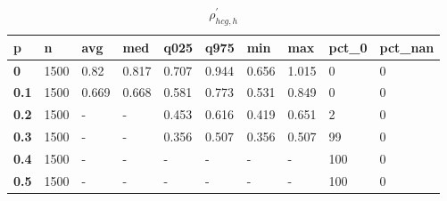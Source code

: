 \begin{table}[h]
 \centering 
\footnotesize
\caption{$\rho_{hcg,h}^\prime $}
\label{tab:alphahcgh}
\begin{tabular}[h]{|l|l|l|l|l|l|l|l|l|l|
    } \hline
\textbf{ p} & \textbf{ n} & \textbf{ avg} & \textbf{ med} & \textbf{ q025} & \textbf{ q975} & \textbf{ min} & \textbf{ max} & \textbf{ pct\_0} & \textbf{ pct\_nan}
    \\ \hline
  \textbf{  0} & 1500 &  0.82 & 0.817 & 0.707 & 0.944 & 0.656 & 1.015 &   0 & 0
    \\ \hline
  \textbf{0.1} & 1500 & 0.669 & 0.668 & 0.581 & 0.773 & 0.531 & 0.849 &   0 & 0
    \\ \hline
  \textbf{0.2} & 1500 & - & - & 0.453 & 0.616 & 0.419 & 0.651 &   2 & 0
    \\ \hline
  \textbf{0.3} & 1500 & - & - & 0.356 & 0.507 & 0.356 & 0.507 &  99 & 0
    \\ \hline
  \textbf{0.4} & 1500 & - & - & - & - & - & - & 100 & 0
    \\ \hline
  \textbf{0.5} & 1500 & - & - & - & - & - & - & 100 & 0
    \\ \hline
 \end{tabular}
 \end{table}

